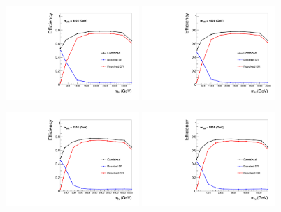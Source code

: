 \begin{figure}[htbp]
  \centering

  \includegraphics[width=0.45\textwidth]{figures/SigEff/WR4000.pdf}
  \hspace{0.01\textwidth}
  \includegraphics[width=0.45\textwidth]{figures/SigEff/WR4600.pdf}
  \vspace{0.01\textwidth}

  \includegraphics[width=0.45\textwidth]{figures/SigEff/WR5200.pdf}
  \hspace{0.01\textwidth}
  \includegraphics[width=0.45\textwidth]{figures/SigEff/WR5800.pdf}
  \vspace{0.01\textwidth}


\end{figure}
